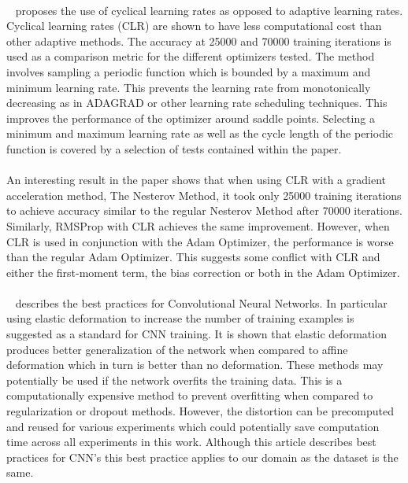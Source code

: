 \documentclass{article}
\begin{document}
 \paragraph{}~\citet{smith2017cyclical} proposes  the use of cyclical learning rates as opposed to adaptive learning rates. Cyclical learning rates (CLR) are shown to have less computational cost than other adaptive methods.  The accuracy at 25000 and 70000 training iterations is used as a comparison metric for the different optimizers tested.
 The method involves sampling a periodic function which is bounded by a maximum and minimum learning rate. This prevents the learning rate from monotonically decreasing as in ADAGRAD or other learning rate scheduling techniques. This improves the performance of the optimizer around saddle points. Selecting a minimum and maximum learning rate as well as the cycle length of the periodic function is covered by a selection of tests contained within the paper. 
 
 \paragraph{}An interesting result in the paper shows that when using CLR with a gradient acceleration method, The Nesterov Method, it took only 25000 training iterations to achieve accuracy similar to the regular Nesterov Method after 70000 iterations. Similarly, RMSProp with CLR achieves the same improvement. However, when CLR is used in conjunction with the Adam Optimizer, the performance is worse than the regular Adam Optimizer. This suggests some conflict with CLR and either the first-moment term, the bias correction or both in the Adam Optimizer.
 
 \paragraph{}~\citet{Simard2003BestPF} describes the best practices for Convolutional Neural Networks. In particular using elastic deformation to increase the number of training examples is suggested as a standard for CNN training. It is shown that elastic deformation produces better generalization of the network when compared to affine deformation which in turn is better than no deformation. These methods may potentially be used if the network overfits the training data. This is a computationally expensive method to prevent overfitting when compared to regularization or dropout methods. However, the distortion can be precomputed and reused for various experiments which could potentially save computation time across all experiments in this work. Although this article describes best practices for CNN's this best practice applies to our domain as the dataset is the same.
 
\end{document}
